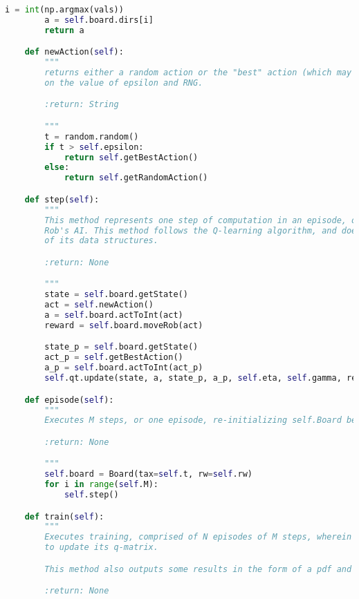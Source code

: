 \documentclass[12pt,a4paper]{article}
\begin{document}
\begin{lstlisting}[language=Python,numbers=none,basicstyle=\tiny]
        i = int(np.argmax(vals))
        a = self.board.dirs[i]
        return a

    def newAction(self):
        """
        returns either a random action or the "best" action (which may be random), depending
        on the value of epsilon and RNG.

        :return: String

        """
        t = random.random()
        if t > self.epsilon:
            return self.getBestAction()
        else:
            return self.getRandomAction()

    def step(self):
        """
        This method represents one step of computation in an episode, or one "move" made by
        Rob's AI. This method follows the Q-learning algorithm, and does in-place updating
        of its data structures.

        :return: None

        """
        state = self.board.getState()
        act = self.newAction()
        a = self.board.actToInt(act)
        reward = self.board.moveRob(act)

        state_p = self.board.getState()
        act_p = self.getBestAction()
        a_p = self.board.actToInt(act_p)
        self.qt.update(state, a, state_p, a_p, self.eta, self.gamma, reward)

    def episode(self):
        """
        Executes M steps, or one episode, re-initializing self.Board beforehand.

        :return: None

        """
        self.board = Board(tax=self.t, rw=self.rw)
        for i in range(self.M):
            self.step()

    def train(self):
        """
        Executes training, comprised of N episodes of M steps, wherein the algorithm is permitted
        to update its q-matrix.

        This method also outputs some results in the form of a pdf and a text file.

        :return: None


\end{lstlisting}
\end{document}
